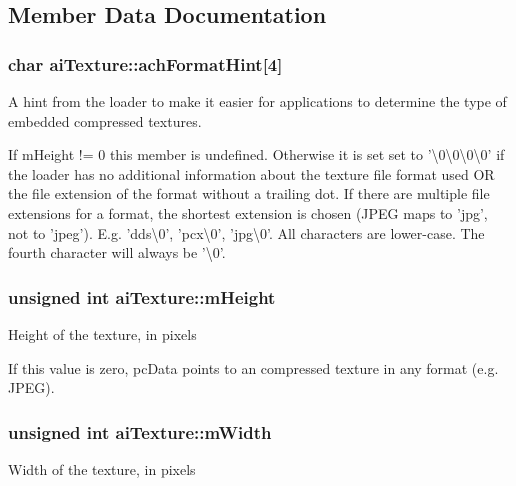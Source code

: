 \subsection{Member Data Documentation}
\hypertarget{structai_texture_aa9f44996acf3b301bfeb4e5348311540}{
\subsubsection[{ach\-Format\-Hint}]{\setlength{\rightskip}{0pt plus 5cm}char ai\-Texture\-::ach\-Format\-Hint\mbox{[}4\mbox{]}}}\label{structai_texture_aa9f44996acf3b301bfeb4e5348311540}
A hint from the loader to make it easier for applications to determine the type of embedded compressed textures.

If m\-Height != 0 this member is undefined. Otherwise it is set set to '\textbackslash{}0\textbackslash{}0\textbackslash{}0\textbackslash{}0' if the loader has no additional information about the texture file format used O\-R the file extension of the format without a trailing dot. If there are multiple file extensions for a format, the shortest extension is chosen (J\-P\-E\-G maps to 'jpg', not to 'jpeg'). E.\-g. 'dds\textbackslash{}0', 'pcx\textbackslash{}0', 'jpg\textbackslash{}0'. All characters are lower-\/case. The fourth character will always be '\textbackslash{}0'. \hypertarget{structai_texture_ac1e2fa6f1f646e9c55e3985d4418a752}{
\subsubsection[{m\-Height}]{\setlength{\rightskip}{0pt plus 5cm}unsigned int ai\-Texture\-::m\-Height}}\label{structai_texture_ac1e2fa6f1f646e9c55e3985d4418a752}
Height of the texture, in pixels

If this value is zero, pc\-Data points to an compressed texture in any format (e.\-g. J\-P\-E\-G). \hypertarget{structai_texture_aaa3ad8cfe44fdc4dea2db91977d92234}{
\subsubsection[{m\-Width}]{\setlength{\rightskip}{0pt plus 5cm}unsigned int ai\-Texture\-::m\-Width}}\label{structai_texture_aaa3ad8cfe44fdc4dea2db91977d92234}
Width of the texture, in pixels

